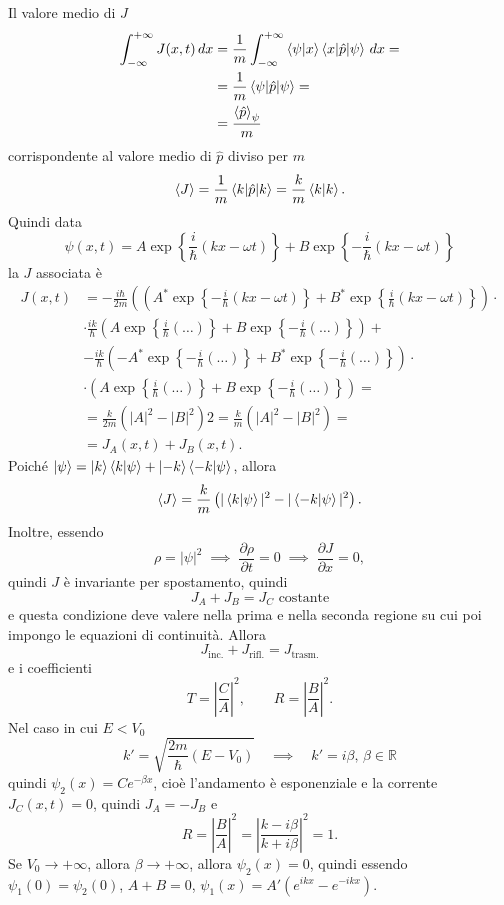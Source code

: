 Il valore medio di \( J \)
\begin{align*}
\int_{-\infty}^{+\infty} J(x, t) \, dx &= \frac{1}{m} \int_{-\infty}^{+\infty} \braket{\psi|x} \braket{x|\hat{p}|\psi} \, dx = \\
&= \frac{1}{m} \braket{\psi|\hat{p}|\psi} = \\
&= \frac{\braket{\hat{p}}_\psi}{m}
\end{align*}
corrispondente al valore medio di \( \hat{p} \) diviso per \( m \)
\[
\braket{J} = \frac{1}{m} \braket{k|\hat{p}|k} = \frac{k}{m} \braket{k|k}.
\]
Quindi data
\[
\psi(x, t) = A \exp \left\{ \frac{i}{\hbar} (kx - \omega t) \right\} + B \exp \left\{ -\frac{i}{\hbar} (kx - \omega t) \right\}
\]
la \( J \) associata è 
\begin{align*}
J(x, t) &= -\frac{i\hbar}{2m} \left( \left( A^* \exp \left\{ -\frac{i}{\hbar} (kx - \omega t) \right\} + B^* \exp \left\{ \frac{i}{\hbar} (kx - \omega t) \right\} \right) \right. \cdot \\
&\cdot \frac{ik}{\hbar} \left( A \exp \left\{ \frac{i}{\hbar} (\dots) \right\} + B \exp \left\{ -\frac{i}{\hbar} (\dots) \right\} \right) + \\
&- \frac{ik}{\hbar} \left( -A^* \exp \left\{ -\frac{i}{\hbar} (\dots) \right\} + B^* \exp \left\{ -\frac{i}{\hbar} (\dots) \right\}  \right) \cdot \\
&\cdot \left( A \exp \left\{ \frac{i}{\hbar} (\dots) \right\} + B \exp \left\{ -\frac{i}{\hbar} (\dots) \right\} \right) = \\
&= \frac{k}{2m} \left( |A|^2 - |B|^2 \right) 2 = \frac{k}{m} \left( |A|^2 - |B|^2 \right) = \\
&= J_A(x, t) + J_B(x, t).
\end{align*}
Poiché \( \ket{\psi} = \ket{k} \braket{k|\psi} + \ket{-k} \braket{-k|\psi} \), allora 
\[
\braket{J} = \frac{k}{m} \left( |\braket{k|\psi}|^2 - |\braket{-k|\psi}|^2 \right).
\]
Inoltre, essendo 
\[
\rho = |\psi|^2 \; \implies \; \frac{\partial \rho}{\partial t} = 0 \; \implies \; \frac{\partial J}{\partial x} = 0,
\]
quindi \( J \) è invariante per spostamento, quindi 
\[
J_A + J_B = J_C \text{ costante}
\]
e questa condizione deve valere nella prima e nella seconda regione su cui poi impongo le equazioni di continuità. Allora 
\[
J_{\text{inc.}} + J_{\text{rifl.}} = J_{\text{trasm.}}
\]
e i coefficienti
\[
T = \left| \frac{C}{A} \right|^2, \qquad R = \left| \frac{B}{A} \right|^2.
\]
Nel caso in cui \( E < V_0 \)
\[
k' = \sqrt{\frac{2m}{\hbar}(E - V_0)} \quad \implies \quad k' = i \beta, \, \beta \in \mathbb{R}
\]
quindi \( \psi_2(x) = C e^{-\beta x} \), cioè l'andamento è esponenziale e la corrente \( J_C(x, t) = 0 \), quindi \( J_A = - J_B \) e 
\[
R = \left| \frac{B}{A} \right|^2 = \left| \frac{k - i\beta}{k + i\beta} \right|^2 = 1.
\]
Se \( V_0 \to +\infty \), allora \( \beta \to +\infty \), allora \( \psi_2(x) = 0 \), quindi essendo \( \psi_1(0) = \psi_2(0) \), \( A + B = 0 \), \( \psi_1(x) = A' (e^{ikx} - e^{-ikx}) \).